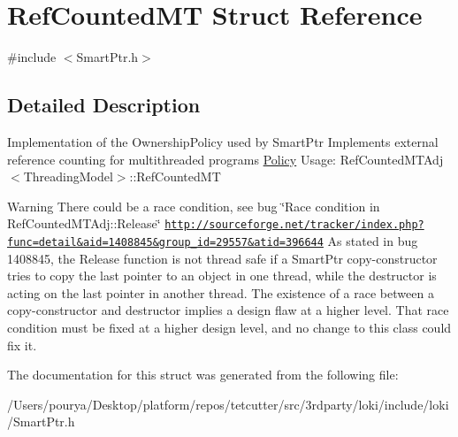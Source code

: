 \hypertarget{structRefCountedMT}{}\section{Ref\+Counted\+M\+T Struct Reference}
\label{structRefCountedMT}


{\ttfamily \#include $<$Smart\+Ptr.\+h$>$}



\subsection{Detailed Description}
Implementation of the Ownership\+Policy used by Smart\+Ptr Implements external reference counting for multithreaded programs \hyperlink{structPolicy}{Policy} Usage\+: Ref\+Counted\+M\+T\+Adj$<$\+Threading\+Model$>$\+::\+Ref\+Counted\+M\+T

\begin{DoxyParagraph}{Warning}
There could be a race condition, see bug \char`\"{}\+Race condition in Ref\+Counted\+M\+T\+Adj\+::\+Release\char`\"{} \href{http://sourceforge.net/tracker/index.php?func=detail&aid=1408845&group_id=29557&atid=396644}{\tt http\+://sourceforge.\+net/tracker/index.\+php?func=detail\&aid=1408845\&group\+\_\+id=29557\&atid=396644} As stated in bug 1408845, the Release function is not thread safe if a Smart\+Ptr copy-\/constructor tries to copy the last pointer to an object in one thread, while the destructor is acting on the last pointer in another thread. The existence of a race between a copy-\/constructor and destructor implies a design flaw at a higher level. That race condition must be fixed at a higher design level, and no change to this class could fix it. 
\end{DoxyParagraph}


The documentation for this struct was generated from the following file\+:\begin{DoxyCompactItemize}
\item 
/\+Users/pourya/\+Desktop/platform/repos/tetcutter/src/3rdparty/loki/include/loki/Smart\+Ptr.\+h\end{DoxyCompactItemize}
